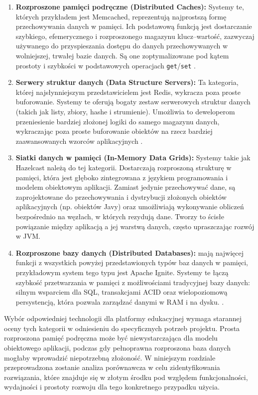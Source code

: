 \begin{enumerate}
    \item \textbf{Rozproszone pamięci podręczne (Distributed Caches):} Systemy te, których przykładem jest Memcached, reprezentują najprostszą formę przechowywania danych w pamięci. Ich podstawową funkcją jest dostarczanie szybkiego, efemerycznego i rozproszonego magazynu klucz–wartość, zazwyczaj używanego do przyspieszania dostępu do danych przechowywanych w wolniejszej, trwałej bazie danych. Są one zoptymalizowane pod kątem prostoty i szybkości w podstawowych operacjach \texttt{get}/\texttt{set} \cite{memcached-docs}.
    \item \textbf{Serwery struktur danych (Data Structure Servers):} Ta kategoria, której najsłynniejszym przedstawicielem jest Redis, wykracza poza proste buforowanie. Systemy te oferują bogaty zestaw serwerowych struktur danych (takich jak listy, zbiory, hashe i strumienie). Umożliwia to deweloperom przeniesienie bardziej złożonej logiki do samego magazynu danych, wykraczając poza proste buforowanie obiektów na rzecz bardziej zaawansowanych wzorców aplikacyjnych \cite{redis-docs}.
    \item \textbf{Siatki danych w pamięci (In-Memory Data Grids):} Systemy takie jak Hazelcast należą do tej kategorii. Dostarczają rozproszoną strukturę w pamięci, która jest głęboko zintegrowana z językiem programowania i modelem obiektowym aplikacji. Zamiast jedynie przechowywać dane, są zaprojektowane do przechowywania i dystrybucji złożonych obiektów aplikacyjnych (np. obiektów Javy) oraz umożliwiają wykonywanie obliczeń bezpośrednio na węzłach, w których rezydują dane. Tworzy to ścisłe powiązanie między aplikacją a jej warstwą danych, często upraszczając rozwój w JVM\cite{hazelcast-docs}.
    \item \textbf{Rozproszone bazy danych (Distributed Databases):} mają najwięcej funkcji z wszystkich powyżej przedstawionych typów baz danych w pamięci, przykładowym system tego typu jest Apache Ignite. Systemy te łączą szybkość przetwarzania w pamięci z możliwościami tradycyjnej bazy danych: silnym wsparciem dla SQL, transakcjami ACID oraz wielopoziomową persystencją, która pozwala zarządzać danymi w RAM i na dysku. \cite{ignite-docs}.
\end{enumerate}

Wybór odpowiedniej technologii dla platformy edukacyjnej wymaga starannej oceny tych kategorii w odniesieniu do specyficznych potrzeb projektu. Prosta rozproszona pamięć podręczna może być niewystarczająca dla modelu obiektowego aplikacji, podczas gdy pełnoprawna rozproszona baza danych mogłaby wprowadzić niepotrzebną złożoność. W niniejszym rozdziale przeprowadzona zostanie analiza porównawcza w celu zidentyfikowania rozwiązania, które znajduje się w złotym środku pod względem funkcjonalności, wydajności i prostoty rozwoju dla tego konkretnego przypadku użycia.

